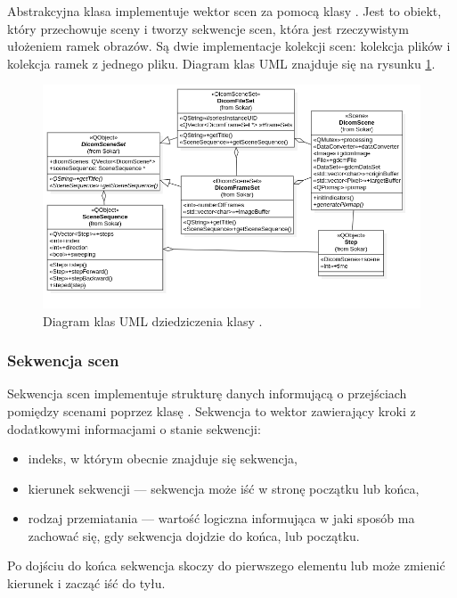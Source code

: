 \label{sec:sokar-scenesets}

Abstrakcyjna klasa  implementuje wektor scen za pomocą klasy .
Jest to obiekt, który przechowuje sceny i tworzy sekwencje scen, która jest rzeczywistym ułożeniem ramek obrazów.
Są dwie implementacje kolekcji scen: kolekcja plików i kolekcja ramek z jednego pliku.
Diagram klas UML znajduje się na rysunku \ref{uml:sokar-scene-sets}.

\begin{figure}[!htbp]
    \centering
    \includegraphics[width=\textwidth]{img/uml/sokar-scene-sets.png}
    \caption{Diagram klas UML dziedziczenia klasy .}
    \label{uml:sokar-scene-sets}
\end{figure}

\subsubsection{Sekwencja scen}
\label{sec:sokar-scenesequence}

\par
Sekwencja scen implementuje strukturę danych informującą o przejściach pomiędzy scenami poprzez klasę .
Sekwencja to wektor zawierający kroki z dodatkowymi informacjami o stanie sekwencji:
\begin{itemize}
    \item indeks, w którym obecnie znajduje się sekwencja,
    \item kierunek sekwencji --- sekwencja może iść w stronę początku lub końca,
    \item rodzaj przemiatania --- wartość logiczna informująca w jaki sposób ma zachować się, gdy sekwencja dojdzie do końca, lub początku.
\end{itemize}
Po dojściu do końca sekwencja skoczy do pierwszego elementu lub może zmienić kierunek i zacząć iść do tyłu.

